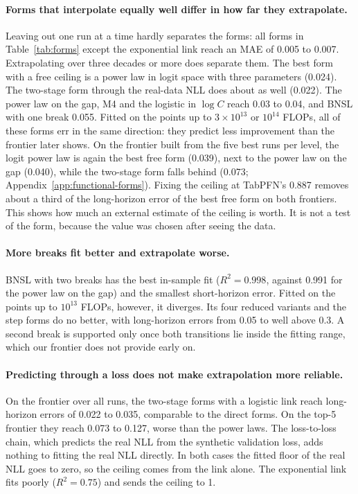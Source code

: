 \paragraph{Forms that interpolate equally well differ in how far they extrapolate.}
Leaving out one run at a time hardly separates the forms: all forms in Table~\ref{tab:forms} except the exponential
link reach an MAE of 0.005 to 0.007. Extrapolating over three decades or more does separate them. The best form with a
free ceiling is a power law in logit space with three parameters (0.024). The two-stage form through the real-data NLL
does about as well (0.022). The power law on the gap, M4 and the logistic in $\log C$ reach 0.03 to 0.04, and BNSL
with one break 0.055. Fitted on the points up to $3\times10^{13}$ or $10^{14}$ FLOPs, all of these forms err in the
same direction: they predict less improvement than the frontier later shows. On the frontier built from the five best
runs per level, the logit power law is again the best free form (0.039), next to the power law on the gap (0.040),
while the two-stage form falls behind (0.073; Appendix~\ref{app:functional-forms}). Fixing the ceiling at TabPFN's
0.887 removes about a third of the long-horizon error of the best free form on both frontiers. This shows how much an
external estimate of the ceiling is worth. It is not a test of the form, because the value was chosen after seeing the
data.

\paragraph{More breaks fit better and extrapolate worse.}
BNSL with two breaks has the best in-sample fit ($R^2=0.998$, against 0.991 for the power law on the gap) and the
smallest short-horizon error. Fitted on the points up to $10^{13}$ FLOPs, however, it diverges. Its four reduced variants and
the step forms do no better, with long-horizon errors from 0.05 to well above 0.3. A second break is supported only once both transitions lie inside the fitting range, which
our frontier does not provide early on.

\paragraph{Predicting through a loss does not make extrapolation more reliable.}
On the frontier over all runs, the two-stage forms with a logistic link reach long-horizon errors of 0.022 to 0.035,
comparable to the direct forms. On the top-5 frontier they reach 0.073 to 0.127, worse than the power laws. The
loss-to-loss chain, which predicts the real NLL from the synthetic validation loss, adds nothing to fitting the real NLL
directly. In both cases the fitted floor of the real NLL goes to zero, so the ceiling comes from the link alone. The
exponential link fits poorly ($R^2=0.75$) and sends the ceiling to 1.


